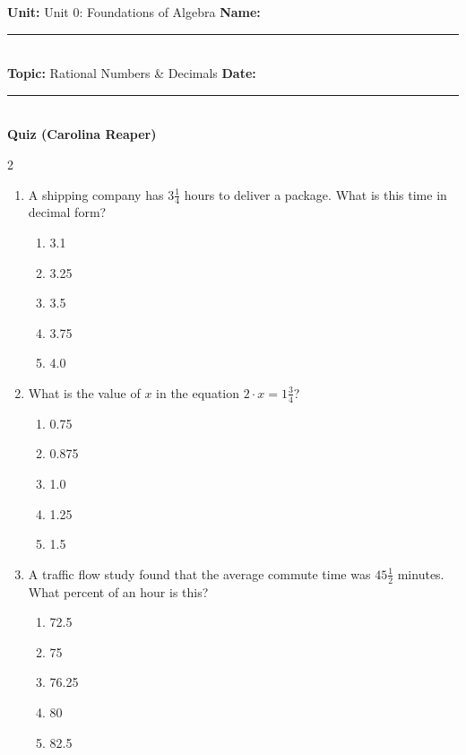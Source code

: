 \documentclass[10pt]{article}
\begin{document}
\enlargethispage{2.5cm}

\begin{tcolorbox}[colback=mainblue!5, colframe=mainblue, sharp corners, boxrule=0.5pt]
    \small \textbf{Unit:} Unit 0: Foundations of Algebra \hfill \textbf{Name:} \rule{3cm}{0.4pt} \\
    \small \textbf{Topic:} Rational Numbers & Decimals \hfill \textbf{Date:} \rule{2cm}{0.4pt} \\
    \centering \textbf{\large Quiz (Carolina Reaper)}
\end{tcolorbox}

\vspace{0.2cm}

\begin{multicols}{2}
\begin{enumerate}[label=\textbf{Q\arabic*.}, leftmargin=*, itemsep=6pt, parsep=0pt]

  \item \small A shipping company has $3 \frac{1}{4}$ hours to deliver a package. What is this time in decimal form?
  \begin{enumerate}[label=(\Alph*), leftmargin=0.6cm, nosep, itemsep=2pt]
    \item 3.1
    \item 3.25
    \item 3.5
    \item 3.75
    \item 4.0
  \end{enumerate}

  \item \small What is the value of $x$ in the equation $2 \cdot x = 1 \frac{3}{4}$?
  \begin{enumerate}[label=(\Alph*), leftmargin=0.6cm, nosep, itemsep=2pt]
    \item 0.75
    \item 0.875
    \item 1.0
    \item 1.25
    \item 1.5
  \end{enumerate}

  \item \small A traffic flow study found that the average commute time was $45 \frac{1}{2}$ minutes. What percent of an hour is this?
  \begin{enumerate}[label=(\Alph*), leftmargin=0.6cm, nosep, itemsep=2pt]
    \item 72.5%
    \item 75%
    \item 76.25%
    \item 80%
    \item 82.5%
  \end{enumerate}


\end{enumerate}
\end{multicols}
\end{document}
